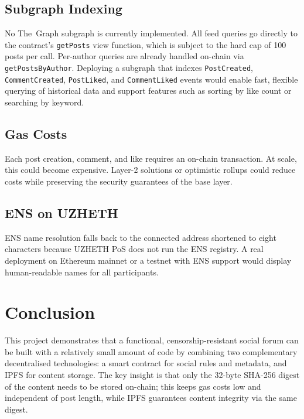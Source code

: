 \documentclass[11pt]{article}
\begin{document}
\subsection{Subgraph Indexing}

No The~Graph subgraph is currently implemented. All feed queries go directly to the contract's \texttt{getPosts} view function, which is subject to the hard cap of 100 posts per call. Per-author queries are already handled on-chain via \texttt{getPostsByAuthor}. Deploying a subgraph that indexes \texttt{PostCreated}, \texttt{CommentCreated}, \texttt{PostLiked}, and \texttt{CommentLiked} events would enable fast, flexible querying of historical data and support features such as sorting by like count or searching by keyword.

\subsection{Gas Costs}

Each post creation, comment, and like requires an on-chain transaction. At scale, this could become expensive. Layer-2 solutions or optimistic rollups could reduce costs while preserving the security guarantees of the base layer.

\subsection{ENS on UZHETH}

ENS name resolution falls back to the connected address shortened to eight characters because UZHETH PoS does not run the ENS registry. A real deployment on Ethereum mainnet or a testnet with ENS support would display human-readable names for all participants.

\section{Conclusion}
\label{sec:conclusion}

This project demonstrates that a functional, censorship-resistant social forum can be built with a relatively small amount of code by combining two complementary decentralised technologies: a smart contract for social rules and metadata, and IPFS for content storage. The key insight is that only the 32-byte SHA-256 digest of the content needs to be stored on-chain; this keeps gas costs low and independent of post length, while IPFS guarantees content integrity via the same digest.
\end{document}
